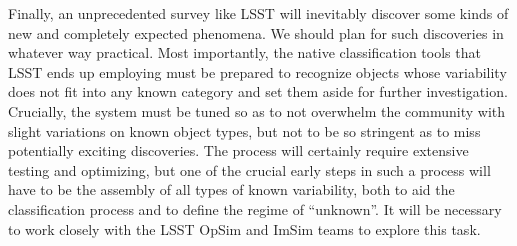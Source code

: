 Finally, an unprecedented survey like LSST will inevitably discover some kinds of new and completely expected phenomena. We should plan for such discoveries in whatever way practical. Most importantly, the native classification tools that LSST ends up employing must be prepared to recognize objects whose variability does not fit into any known category and set them aside for further investigation. Crucially, the system must be tuned so as to not overwhelm the community with slight variations on known object types, but not to be so stringent as to miss potentially exciting discoveries. The process will certainly require extensive testing and optimizing, but one of the crucial early steps in such a process will have to be the assembly of all types of known variability, both to aid the classification process and to define the regime of “unknown”. It will be necessary to work closely with the LSST OpSim and ImSim teams to explore this task. 

